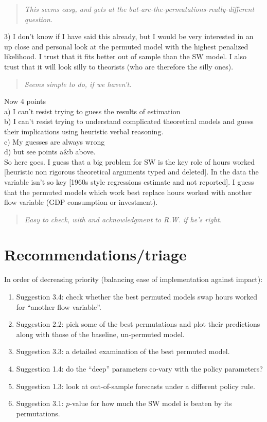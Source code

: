 \documentclass{article}
\begin{document}
\begin{quotation} {\em This seems easy, and gets at the but-are-the-permutations-really-different question.}
\end{quotation}

3) I don't know if I have said this already, but I would be very interested in an up close and personal look at the permuted model with the highest penalized likelihood.  I trust that it fits better out of sample than the SW model.  I also trust that it will look silly to theorists (who are therefore the silly ones).

\begin{quotation} {\em Seems simple to do, if we haven't.}
\end{quotation}

Now 4 points\\
a) I can't resist trying to guess the results of estimation\\
b) I can't resist trying to understand complicated theoretical models and guess their implications using heuristic verbal reasoning.\\
c) My guesses are always wrong\\
d) but see points a\&b above.\\

So here goes.  I guess that a big problem for SW is the key role of hours worked [heuristic non rigorous theoretical arguments typed and deleted].  In the data the variable isn't so key [1960s style regressions estimate and not reported].  I guess that the permuted models which work best replace hours worked with another flow variable (GDP consumption or investment).  

\begin{quotation} {\em Easy to check, with and acknowledgment to R.W. if he's right.}
\end{quotation}

\section{Recommendations/triage}

In order of decreasing priority (balancing ease of implementation against
impact):

\begin{enumerate}
\item Suggestion 3.4: check whether the best permuted models swap hours worked
  for ``another flow variable''.
\item Suggestion 2.2: pick some of the best permutations and plot their
  predictions along with those of the baseline, un-permuted model.
\item Suggestion 3.3: a detailed examination of the best permuted model.
\item Suggestion 1.4: do the ``deep'' parameters co-vary with the policy parameters?
\item Suggestion 1.3: look at out-of-sample forecasts under a different policy
  rule.
\item Suggestion 3.1: $p$-value for how much the SW model is beaten by its
  permutations.
\end{enumerate}
\end{document}
